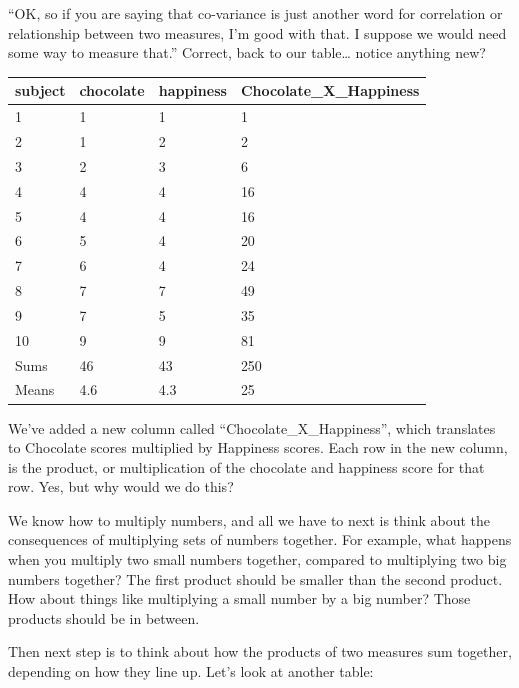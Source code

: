 \documentclass[
]{book}
\begin{document}
``OK, so if you are saying that co-variance is just another word for correlation or relationship between two measures, I'm good with that. I suppose we would need some way to measure that.'' Correct, back to our table\ldots{} notice anything new?

\begin{tabular}{l|l|l|l}
\hline
subject & chocolate & happiness & Chocolate\_X\_Happiness\\
\hline
1 & 1 & 1 & 1\\
\hline
2 & 1 & 2 & 2\\
\hline
3 & 2 & 3 & 6\\
\hline
4 & 4 & 4 & 16\\
\hline
5 & 4 & 4 & 16\\
\hline
6 & 5 & 4 & 20\\
\hline
7 & 6 & 4 & 24\\
\hline
8 & 7 & 7 & 49\\
\hline
9 & 7 & 5 & 35\\
\hline
10 & 9 & 9 & 81\\
\hline
Sums & 46 & 43 & 250\\
\hline
Means & 4.6 & 4.3 & 25\\
\hline
\end{tabular}

We've added a new column called ``Chocolate\_X\_Happiness'', which translates to Chocolate scores multiplied by Happiness scores. Each row in the new column, is the product, or multiplication of the chocolate and happiness score for that row. Yes, but why would we do this?

We know how to multiply numbers, and all we have to next is think about the consequences of multiplying sets of numbers together. For example, what happens when you multiply two small numbers together, compared to multiplying two big numbers together? The first product should be smaller than the second product. How about things like multiplying a small number by a big number? Those products should be in between.

Then next step is to think about how the products of two measures sum together, depending on how they line up. Let's look at another table:
\end{document}
